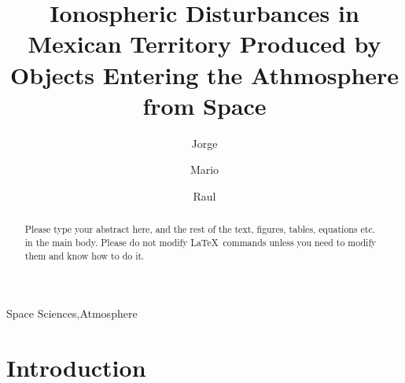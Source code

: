 \documentclass[times,twocolumn,final,authoryear]{elsarticle}
\begin{document}

\begin{frontmatter}

\title{Ionospheric Disturbances in Mexican Territory Produced by Objects Entering the Athmosphere from Space }%

\author[1]{Jorge }

\author[1]{Mario }
\author[1]{Raul }

\address[1]{Escuela Nacional de Estudios Superiores, UNAM, campus Morelia, Antigua Carretera a P\'atzcuaro No. 8701
Col. Ex Hacienda de San Jos\'e de la Huerta, Morelia, Michoac\'an, 58190, M\'exico}



\begin{abstract}
Please type your abstract here, and the rest of the text, figures,
tables, equations etc. in the main body. Please do not modify LaTeX\ 
commands unless you need to modify them and know how to do it.
\end{abstract}

\begin{keyword}
\KWD Space Sciences\sep Atmosphere%
\end{keyword}

\end{frontmatter}


\section{Introduction}
\label{sec1}
\end{document}
